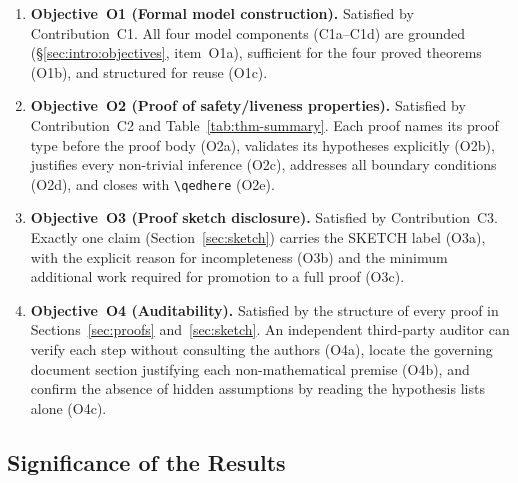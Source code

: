 \documentclass[12pt]{article}
\theoremstyle{definition}
\begin{document}
\begin{enumerate}

    \item \textbf{Objective~O1 (Formal model construction).}
          Satisfied by Contribution~C1.  All four model components
          (C1a--C1d) are grounded (\S\ref{sec:intro:objectives},
          item~O1a), sufficient for the four proved theorems (O1b),
          and structured for reuse (O1c).

    \item \textbf{Objective~O2 (Proof of safety/liveness properties).}
          Satisfied by Contribution~C2 and Table~\ref{tab:thm-summary}.
          Each proof names its proof type before the proof body (O2a),
          validates its hypotheses explicitly (O2b), justifies every
          non-trivial inference (O2c), addresses all boundary conditions
          (O2d), and closes with \verb|\qedhere| (O2e).

    \item \textbf{Objective~O3 (Proof sketch disclosure).}
          Satisfied by Contribution~C3.  Exactly one claim
          (Section~\ref{sec:sketch}) carries the SKETCH label (O3a),
          with the explicit reason for incompleteness (O3b) and the
          minimum additional work required for promotion to a full
          proof (O3c).

    \item \textbf{Objective~O4 (Auditability).}
          Satisfied by the structure of every proof in
          Sections~\ref{sec:proofs} and~\ref{sec:sketch}.  An
          independent third-party auditor can verify each step
          without consulting the authors (O4a), locate the governing
          document section justifying each non-mathematical premise
          (O4b), and confirm the absence of hidden assumptions by
          reading the hypothesis lists alone (O4c).

\end{enumerate}

\subsection{Significance of the Results}
\label{sec:conclusion:significance}
\end{document}
